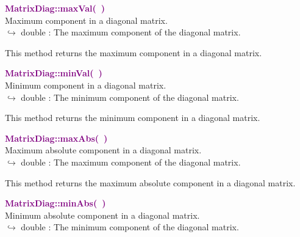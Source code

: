 \textcolor{purple}{\textbf{MatrixDiag::maxVal(~)}}\label{MatrixDiag::maxVal()}\\
Maximum component in a diagonal matrix.\\ \hspace*{10mm}$\hookrightarrow$ double : The maximum component of the diagonal matrix.

This method returns the maximum component in a diagonal matrix.

\textcolor{purple}{\textbf{MatrixDiag::minVal(~)}}\label{MatrixDiag::minVal()}\\
Minimum component in a diagonal matrix.\\ \hspace*{10mm}$\hookrightarrow$ double : The minimum component of the diagonal matrix.

This method returns the minimum component in a diagonal matrix.

\textcolor{purple}{\textbf{MatrixDiag::maxAbs(~)}}\label{MatrixDiag::maxAbs()}\\
Maximum absolute component in a diagonal matrix.\\ \hspace*{10mm}$\hookrightarrow$ double : The maximum component of the diagonal matrix.

This method returns the maximum absolute component in a diagonal matrix.

\textcolor{purple}{\textbf{MatrixDiag::minAbs(~)}}\label{MatrixDiag::minAbs()}\\
Minimum absolute component in a diagonal matrix.\\ \hspace*{10mm}$\hookrightarrow$ double : The minimum component of the diagonal matrix.

